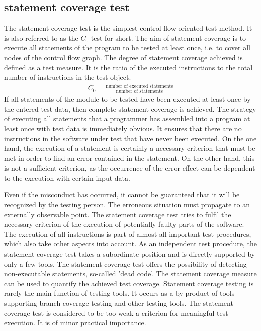 	
	\subsection{statement coverage test}
	The statement coverage test is the simplest control flow oriented test method. It is also referred to as the $C_0$ test for short. The aim of statement coverage is to execute all statements of the program to be tested at least once, i.e. to cover all nodes of the control flow graph. The degree of statement coverage achieved is defined as a test measure. It is the ratio of the executed instructions to the total number of instructions in the test object.
		\begin{align*}
		C_0 = \frac{\textrm{number of executed statements}}{\textrm{number of statements}}
		\end{align*}
	If all statements of the module to be tested have been executed at least once by the entered test data, then complete statement coverage is achieved. The strategy of executing all statements that a programmer has assembled into a program at least once with test data is immediately obvious. It ensures that there are no instructions in the software under test that have never been executed. On the one hand, the execution of a statement is certainly a necessary criterion that must be met in order to find an error contained in the statement. On the other hand, this is not a sufficient criterion, as the occurrence of the error effect can be dependent to the execution with certain input data. 
	
	Even if the misconduct has occurred, it cannot be guaranteed that it will be recognized by the testing person. The erroneous situation must propagate to an externally observable point. The statement coverage test tries to fulfil the necessary criterion of the execution of potentially faulty parts of the software. The execution of all instructions is part of almost all important test procedures, which also take other aspects into account. As an independent test procedure, the statement coverage test takes a subordinate position and is directly supported by only a few tools. The statement coverage test offers the possibility of detecting non-executable statements, so-called 'dead code'. The statement coverage measure can be used to quantify the achieved test coverage. Statement coverage testing is rarely the main function of testing tools. It occurs as a by-product of tools supporting branch coverage testing and other testing tools. The statement coverage test is considered to be too weak a criterion for meaningful test execution. It is of minor practical importance.

